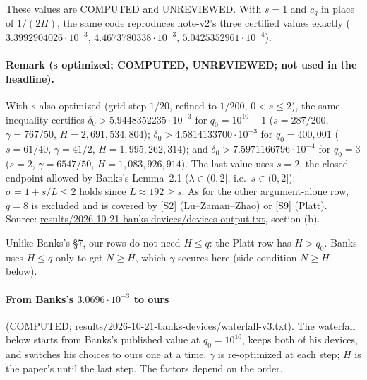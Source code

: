 \documentclass[11pt]{article}
\begin{document}
These values are COMPUTED and UNREVIEWED. With $s=1$ and $c_q$ in place of $1/(2H)$, the same code reproduces note-v2's three certified values exactly ($3.3992904026\cdot10^{-3}$, $4.4673780338\cdot10^{-3}$, $5.0425352961\cdot10^{-4}$).

\paragraph{Remark (s optimized; COMPUTED, UNREVIEWED; not used in the headline).} With $s$ also optimized (grid step $1/20$, refined to $1/200$, $0<s\le2$), the same inequality certifies $\delta_0>5.9448352235\cdot10^{-3}$ for $q_0=10^{10}+1$ ($s=287/200$, $\gamma=767/50$, $H=2{,}691{,}534{,}804$); $\delta_0>4.5814133700\cdot10^{-3}$ for $q_0=400{,}001$ ($s=61/40$, $\gamma=41/2$, $H=1{,}995{,}262{,}314$); and $\delta_0>7.5971166796\cdot10^{-4}$ for $q_0=3$ ($s=2$, $\gamma=6547/50$, $H=1{,}083{,}926{,}914$). The last value uses $s=2$, the closed endpoint allowed by Banks's Lemma~2.1 ($\lambda\in(0,2]$, i.e.\ $s\in(0,2]$); $\sigma=1+s/L\le2$ holds since $L\approx192\ge s$. As for the other argument-alone row, $q=8$ is excluded and is covered by [S2] (Lu--Zaman--Zhao) or [S9] (Platt). Source: \url{results/2026-10-21-banks-devices/devices-output.txt}, section (b).

Unlike Banks's \S7, our rows do not need $H\le q$: the Platt row has $H>q_0$. Banks uses $H\le q$ only to get $N\ge H$, which $\gamma$ secures here (side condition $N\ge H$ below).

\paragraph{From Banks's $3.0696\cdot10^{-3}$ to ours} (COMPUTED; \url{results/2026-10-21-banks-devices/waterfall-v3.txt}). The waterfall below starts from Banks's published value at $q_0=10^{10}$, keeps both of his devices, and switches his choices to ours one at a time. $\gamma$ is re-optimized at each step; $H$ is the paper's until the last step. The factors depend on the order.
\end{document}
